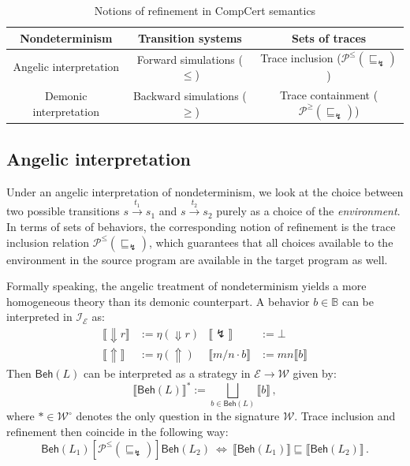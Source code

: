 \documentclass[11pt,oneside]{book}
\theoremstyle{definition}
\newcommand{\kw}[1]{\ensuremath{ \mathsf{#1} }}
\newcommand{\ifr}[1]{\mathrel{[{#1}]}}
\newcommand{\que}{\circ}         %
\newcommand{\refby}{\sqsubseteq} %
\begin{document}
\begin{table} %
  \centering
  \begin{tabular}{ccc}
    \hline
    Nondeterminism
      & Transition systems
      & Sets of traces \\
    \hline
    Angelic interpretation
      & Forward simulations ($\le$)
      & Trace inclusion ($\mathcal{P}^\le(\refby_\lightning)$) \\
    Demonic interpretation
      & Backward simulations ($\ge$)
      & Trace containment ($\mathcal{P}^\ge(\refby_\lightning)$) \\
    \hline
  \end{tabular}
  \caption{Notions of refinement in CompCert semantics}
  \label{tbl:compcertref}
\end{table}


\subsection{Angelic interpretation} \label{sec:sem:fsim} %

Under an angelic interpretation of nondeterminism,
we look at the choice between two possible transitions
$
  s \stackrel{t_1}{\longrightarrow} s_1
$
and
$
  s \stackrel{t_2}{\longrightarrow} s_2
$
purely as a choice of the \emph{environment}.
In terms of sets of behaviors,
the corresponding notion of refinement
is the trace inclusion relation
$\mathcal{P}^\le({\refby_\lightning})$,
which guarantees that
all choices available to the environment in the source program
are available in the target program as well.

Formally speaking,
the angelic treatment of nondeterminism
yields a more homogeneous theory
than its demonic counterpart.
A behavior $b \in \mathbb{B}$ can be interpreted
in $\mathcal{I}_\mathcal{E}$ as:
\begin{align*}
  \llbracket {\Downarrow}r \rrbracket &:= \eta({\Downarrow} r) &
  \llbracket {\lightning} \rrbracket &:= \bot \\
  \llbracket {\Uparrow} \rrbracket &:= \eta({\Uparrow}) &
  \llbracket m / n \cdot b \rrbracket &:=
    m n \llbracket b \rrbracket
\end{align*}
Then $\kw{Beh}(L)$ can be interpreted as a strategy
in $\mathcal{E} \rightarrow \mathcal{W}$ given by:
\[
  \llbracket \kw{Beh}(L) \rrbracket^* :=
    \bigsqcup_{b \in \kw{Beh}(L)} \llbracket b \rrbracket
  \,,
\]
where $* \in \mathcal{W}^\que$ denotes the only question
in the signature $\mathcal{W}$.
Trace inclusion and refinement then
coincide in the following way:
\[
  \kw{Beh}(L_1)
  \ifr{\mathcal{P}^\le({\refby_\lightning})}
  \kw{Beh}(L_2)
  \: \Leftrightarrow \:
  \llbracket \kw{Beh}(L_1) \rrbracket
  \refby
  \llbracket \kw{Beh}(L_2) \rrbracket
  \,.
\]
\end{document}
